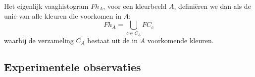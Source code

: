 Het eigenlijk vaaghistogram $Fh_A$, voor een kleurbeeld $A$, defini\"eren we dan als de unie van 
alle kleuren die voorkomen in $A$:
$$
Fh_A = \displaystyle\bigcup_{c \in C_A} FC_c
$$ 
waarbij de verzameling $C_A$ bestaat uit de in $A$ voorkomende kleuren.

\subsection{Experimentele observaties}